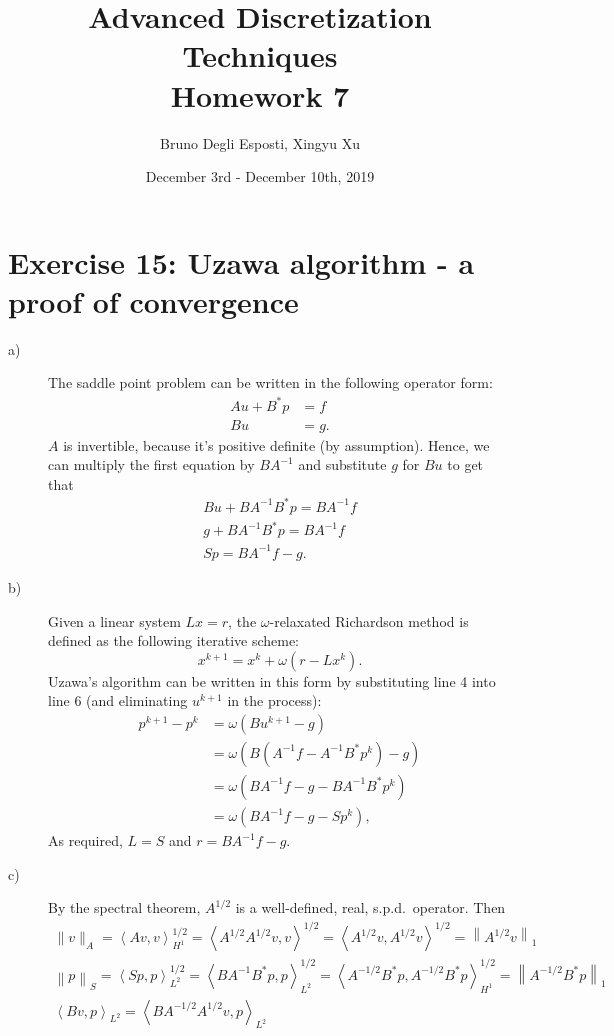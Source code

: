 \documentclass[a4paper]{article}
\title{\huge{Advanced Discretization Techniques \\ Homework 7}}
\author{\Large{Bruno Degli Esposti, Xingyu Xu}}
\date{December 3rd - December 10th, 2019}
\newcommand{\norm}[1]{\left\lVert #1 \right\rVert}
\newcommand{\dpair}[1]{\left\langle #1 \right\rangle}
\begin{document}
\maketitle

\section*{Exercise 15: Uzawa algorithm - a proof of convergence}
\begin{description}
\item[a)] The saddle point problem can be written in the following operator form:
	\begin{align*}
	Au + B^\ast p
&	= f \\
	Bu
&	= g.
	\end{align*}
	$A$ is invertible, because it's positive definite (by assumption).
	Hence, we can multiply the first equation by $BA^{-1}$ and
	substitute $g$ for $Bu$ to get that
	\begin{gather*}
	Bu + BA^{-1}B^{\ast}p = BA^{-1} f \\
	g + BA^{-1}B^{\ast}p = BA^{-1} f \\
	Sp = BA^{-1} f - g.
	\end{gather*}
\item[b)] Given a linear system $Lx=r$, the $\omega$-relaxated Richardson method
	is defined as the following iterative scheme:
	\[
	x^{k+1} = x^k + \omega(r-Lx^k).
	\]
	Uzawa's algorithm can be written in this form by substituting line 4 into line 6
	(and eliminating $u^{k+1}$ in the process):
	\begin{align*}
	p^{k+1}-p^k
&	= \omega(Bu^{k+1}-g)\\
&	= \omega(B(A^{-1}f-A^{-1}B^\ast p^k)-g)\\
&	= \omega(BA^{-1}f-g-BA^{-1}B^\ast p^k)\\
&	= \omega(BA^{-1}f-g-Sp^k),
	\end{align*}
	As required, $L = S$ and $r = BA^{-1}f-g$.
\item[c)] By the spectral theorem, $A^{1/2}$ is a well-defined, real,
	s.p.d.\ operator. Then
	\begin{gather*}
	\|v\|_A
	= \dpair{Av,v}_{H^1}^{1/2}
	= \dpair{A^{1/2}A^{1/2}v,v}^{1/2}
	= \dpair{A^{1/2}v,A^{1/2}v}^{1/2}
	= \norm{A^{1/2}v}_1 \\
	\norm{p}_S
	= \dpair{Sp,p}_{L^2}^{1/2}
	= \dpair{BA^{-1}B^*p,p}_{L^2}^{1/2}
	= \dpair{A^{-1/2}B^*p,A^{-1/2}B^*p}_{H^1}^{1/2}
	= \norm{A^{-1/2}B^*p}_1 \\
	\dpair{Bv,p}_{L^2}
	= \dpair{BA^{-1/2}A^{1/2}v,p}_{L^2}

\end{gather*}
\end{description}
\end{document}
